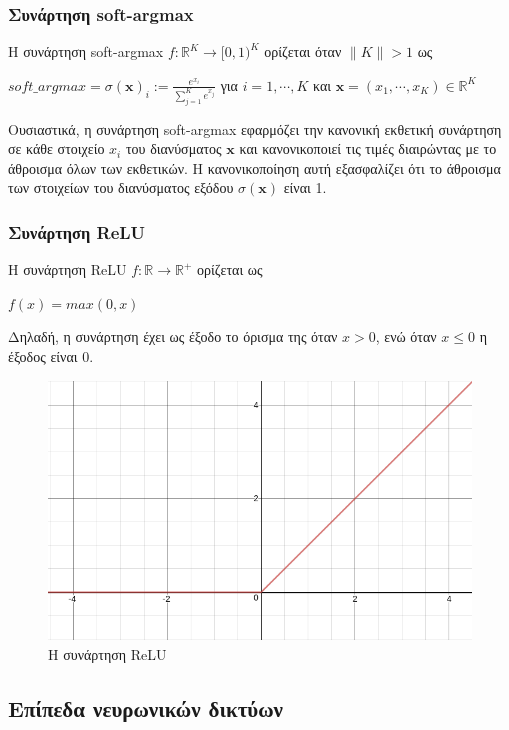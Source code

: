 \subsubsection{Συνάρτηση soft-argmax}
\label{definition:soft-argmax}
Η συνάρτηση soft-argmax \(f: \mathbb{R}^K  \rightarrow [0, 1)^K\) ορίζεται όταν \(\lVert K \rVert > 1\) ως

\(soft\_argmax = \sigma(\boldsymbol{x})_i := \frac{e^{x_i}}{\sum_{j=1}^{K}e^{x_j}}\) για \(i = 1,\cdots,K\) και \(\boldsymbol{x} = (x_1,\cdots,x_K) \in \mathbb{R}^K \)


Ουσιαστικά, η συνάρτηση soft-argmax εφαρμόζει την κανονική εκθετική συνάρτηση σε κάθε στοιχείο \(x_i\) του διανύσματος \(\boldsymbol{x}\) και κανονικοποιεί τις τιμές διαιρώντας με το άθροισμα όλων των εκθετικών. Η κανονικοποίηση αυτή εξασφαλίζει ότι το άθροισμα των στοιχείων του διανύσματος εξόδου \(\sigma(\boldsymbol{x})\) είναι 1.

\subsubsection{Συνάρτηση ReLU}
\label{definition:relu}
Η συνάρτηση ReLU \(f: \mathbb{R} \rightarrow \mathbb{R}^+ \) ορίζεται ως

\( f(x) = max(0, x) \)

Δηλαδή, η συνάρτηση έχει ως έξοδο το όρισμα της όταν \(x > 0\), ενώ όταν \(x \leq 0\) η έξοδος είναι 0.

\begin{figure}[h]
	\centering
	\includegraphics[scale=0.5]{images/appendix/relu_function.png}
	\caption{H συνάρτηση ReLU}
\end{figure}

\subsection{Επίπεδα νευρωνικών δικτύων}
\label{sec:nn_layers}

